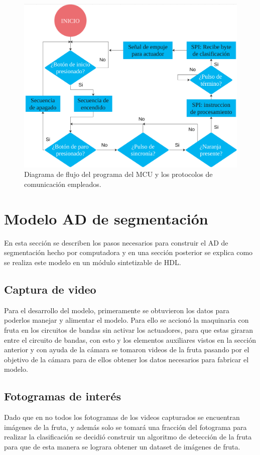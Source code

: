 \documentclass[twoside,spanish,ESP,MSc]{plantillaLabUPV}
\theoremstyle{definition}
\begin{document}
\begin{figure}
	\centering
	\includegraphics[width=0.7\linewidth]{edrawimas/MCUprog}
	\caption{Diagrama de flujo del programa del MCU y los protocolos de comunicación empleados.}
	\label{fig:mcuprog}
\end{figure}

\section{Modelo AD de segmentación} \label{sec:addsgm}

En esta sección se describen los pasos necesarios para construir el AD de segmentación hecho por computadora y en una sección posterior se explica como se realiza este modelo en un módulo sintetizable de HDL.

\subsection{Captura de video}
Para el desarrollo del modelo, primeramente se obtuvieron los datos para poderlos manejar y alimentar el modelo. Para ello se accionó la maquinaria con fruta en los circuitos de bandas sin activar los actuadores, para que estas giraran entre el circuito de bandas, con esto y los elementos auxiliares vistos en la sección anterior y con ayuda de la cámara se tomaron videos de la fruta pasando por el objetivo de la cámara para de ellos obtener los datos necesarios para fabricar el modelo.

\subsection{Fotogramas de interés}
Dado que en no todos los fotogramas de los videos capturados se encuentran imágenes de la fruta, y además solo se tomará una fracción del fotograma para realizar la clasificación se decidió construir un algoritmo de detección de la fruta para que de esta manera se lograra obtener un dataset de imágenes de fruta. \\
\end{document}
